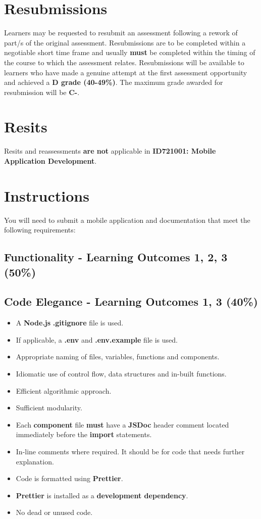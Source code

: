 \documentclass{article}
\begin{document}
\section*{Resubmissions}
Learners may be requested to resubmit an assessment following a rework of part/s of the original assessment. Resubmissions are to be completed within a negotiable short time frame and usually \textbf{must} be completed within the timing of the course to which the assessment relates. Resubmissions will be available to learners who have made a genuine attempt at the first assessment opportunity and achieved a \textbf{D grade (40-49\%)}. The maximum grade awarded for resubmission will be \textbf{C-}.

\section*{Resits}
Resits and reassessments \textbf{are not} applicable in \textbf{ID721001: Mobile Application Development}.

\section*{Instructions}
You will need to submit a mobile application and documentation that meet the following requirements:

\subsection*{Functionality - Learning Outcomes 1, 2, 3 (50\%)}
\begin{itemize}
	
\end{itemize}

\subsection*{Code Elegance - Learning Outcomes 1, 3 (40\%)}
\begin{itemize}
	\item A \textbf{Node.js} \textbf{.gitignore} file is used.
	\item If applicable, a \textbf{.env} and \textbf{.env.example} file is used.
  \item Appropriate naming of files, variables, functions and components.
	\item Idiomatic use of control flow, data structures and in-built functions.
  \item Efficient algorithmic approach.
  \item Sufficient modularity.
  \item Each \textbf{component} file \textbf{must} have a \textbf{JSDoc} header comment located immediately before the \textbf{import} statements.
\item In-line comments where required. It should be for code that needs further explanation.
  \item Code is formatted using \textbf{Prettier}.
  \item \textbf{Prettier} is installed as a \textbf{development dependency}.	
\item No dead or unused code. 
\end{itemize}
\end{document}
